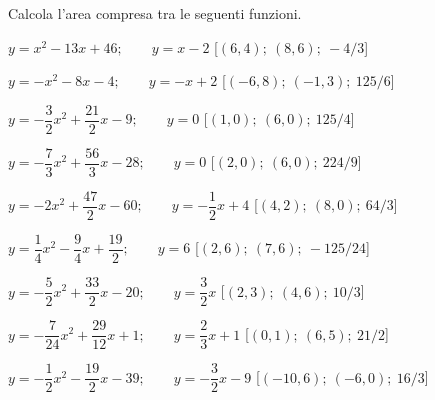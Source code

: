 \begin{esercizio}\label{ese:03.1}
Calcola l'area compresa tra le seguenti funzioni.
 \begin{enumeratea}
\item \(y=x^2 -13x +46; \qquad y=x -2\) \hfill [\((6, 4);~(8, 6);~-4/3\)]
\item \(y=- x^2 -8x -4; \qquad y=- x +2\) \hfill [\((-6, 8);~(-1, 
3);~125/6\)]
\item \(y=-\dfrac{3}{2}x^2 +\dfrac{21}{2}x -9; \qquad y=0\) \hfill [\((1, 
0);~(6, 0);~125/4\)]
\item \(y=-\dfrac{7}{3}x^2 +\dfrac{56}{3}x -28; \qquad y=0\) \hfill [\((2, 
0);~(6, 0);~224/9\)]
\item \(y=-2x^2 +\dfrac{47}{2}x -60; \qquad y=-\dfrac{1}{2}x +4\) \hfill 
[\((4, 2);~(8, 0);~64/3\)]
\item \(y=\dfrac{1}{4}x^2 -\dfrac{9}{4}x +\dfrac{19}{2}; \qquad y=6\) \hfill 
[\((2, 6);~(7, 6);~-125/24\)]
\item \(y=-\dfrac{5}{2}x^2 +\dfrac{33}{2}x -20; \qquad y=\dfrac{3}{2}x \) 
\hfill [\((2, 3);~(4, 6);~10/3\)]
\item \(y=-\dfrac{7}{24}x^2 +\dfrac{29}{12}x +1; \qquad y=\dfrac{2}{3}x +1\) 
\hfill [\((0, 1);~(6, 5);~21/2\)]
\item \(y=-\dfrac{1}{2}x^2 -\dfrac{19}{2}x -39; \qquad y=-\dfrac{3}{2}x -9\) 
\hfill [\((-10, 6);~(-6, 0);~16/3\)]

\end{enumeratea}
\end{esercizio}
